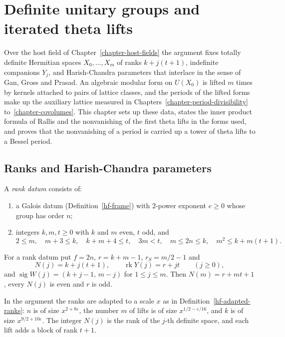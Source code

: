 \chapter{Definite unitary groups and iterated theta lifts}\label{chapter-unitary-theta}

Over the host field of Chapter~\ref{chapter-host-fields} the argument fixes
totally definite Hermitian spaces $X_0,\ldots,X_m$ of ranks $k+j(t+1)$,
indefinite companions $Y_j$, and Harish-Chandra parameters that interlace in
the sense of Gan, Gross and Prasad. An algebraic modular form on $U(X_0)$ is
lifted $m$ times by kernels attached to pairs of lattice classes, and the
periods of the lifted forms make up the auxiliary lattice measured in
Chapters~\ref{chapter-period-divisibility} to~\ref{chapter-covolumes}. This
chapter sets up these data, states the inner product formula of Rallis and the
nonvanishing of the first theta lifts in the forms used, and proves that the
nonvanishing of a period is carried up a tower of theta lifts to a Bessel
period.

\section{Ranks and Harish-Chandra parameters}\label{section-th-ranks}

\begin{definition}\label{th-ranks}
A \emph{rank datum} consists of:
\begin{enumerate}
\item a Galois datum (Definition~\ref{hf-frame}) with $2$-power exponent
  $e\geq0$ whose group has order $n$;
\item integers $k,m,t\geq0$ with $k$ and $m$ even, $t$ odd, and
  \[
  2\leq m,\quad m+3\leq k,\quad k+m+4\leq t,\quad 3m<t,\quad
  m\leq 2n\leq k,\quad m^2\leq k+m(t+1).
  \]
\end{enumerate}
For a rank datum put $f=2n$, $r=k+m-1$, $r_S=m/2-1$ and
\[
N(j)=k+j(t+1),\qquad \operatorname{rk}Y(j)=r+jt\qquad(j\geq0),
\]
and $\operatorname{sig}W(j)=(k+j-1,\,m-j)$ for $1\leq j\leq m$. Then
$N(m)=r+mt+1$, every $N(j)$ is even and $r$ is odd.
\end{definition}

In the argument the ranks are adapted to a scale $x$ as in
Definition~\ref{hf-adapted-ranks}: $n$ is of size $x^{2+8\varepsilon}$, the
number $m$ of lifts is of size $x^{1/2-\varepsilon/16}$, and $k$ is of size
$x^{9/2+10\varepsilon}$. The integer $N(j)$ is the rank of the $j$-th definite
space, and each lift adds a block of rank $t+1$.

